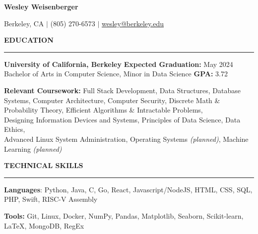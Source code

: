\documentclass{article}
\begin{document}
\pagestyle{fancy}
\fancyhead{}\fancyfoot{}

\newcommand{\header}[1]{
    \vspace{4mm}
    {\large \noindent \textbf{#1}}
    \vspace{1.5mm}
    \hrule
    \vspace{2mm}
}

\begin{center}

    {\LARGE \textbf{Wesley Weisenberger}}

    \vspace{2mm}

    {\large Berkeley, CA  $\mid$ (805) 270-6573
        $\mid$
        \href{mailto:wesley@berkeley.edu}{wesley@berkeley.edu}

    }

\end{center}

\vspace{-2.5mm}

\header{EDUCATION}

\begin{adjustwidth}{1em}{1em}

    \textbf{University of California, Berkeley}
    \hfill
    \textbf{Expected Graduation:} May 2024 \\
    Bachelor of Arts in Computer Science, Minor in Data Science \hfill  \textbf{GPA:} 3.72

    \vspace{2.5mm}

    \textbf{Relevant Coursework:}
        Full Stack Development,
        Data Structures,
        Database Systems,
        Computer Architecture,
        Computer Security,
        Discrete Math \& Probability Theory,
        Efficient Algorithms \& Intractable Problems, \\
        Designing Information Devices and Systems,
        Principles of Data Science,
        Data Ethics, \\
        Advanced Linux System Administration,
        Operating Systems \textit{(planned)},
        Machine Learning \textit{(planned)}

\end{adjustwidth}

\header{TECHNICAL SKILLS}

\begin{adjustwidth}{1em}{1em}

    \textbf{Languages}: Python, Java, C, Go, React, Javascript/NodeJS, HTML, CSS, SQL, PHP, Swift, RISC-V Assembly

    \vspace{1mm}

    \textbf{Tools:} Git, Linux, Docker, NumPy, Pandas, Matplotlib, Seaborn, Scikit-learn, \LaTeX, MongoDB, RegEx

\end{adjustwidth}
\end{document}
